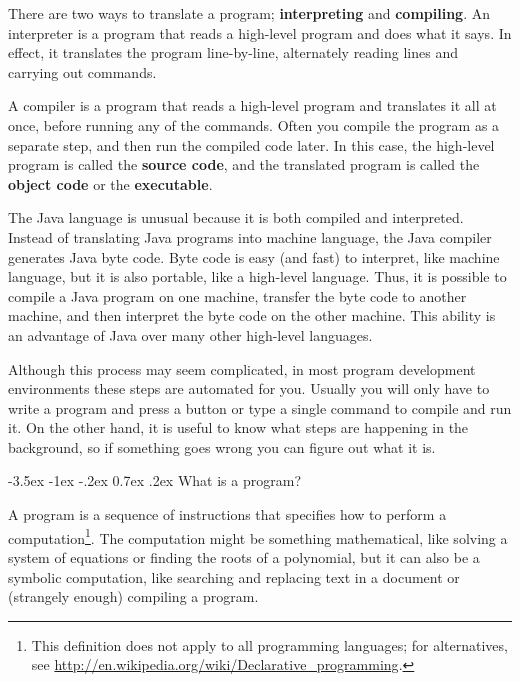 \documentclass{book}
\makeatletter
\renewcommand{\section}{\@startsection 
    {section} {1} {0mm}%
    {-3.5ex \@plus -1ex \@minus -.2ex}%
    {0.7ex \@plus.2ex}%
    {\normalfont\Large\bfseries}}
\newcommand{\beforefig}{\vspace{1.3\parskip}}
\newcommand{\afterfig}{\vspace{-0.2\parskip}}
\newcommand{\myfig}[1]{
    \beforefig
    \centerline{\epsfig{#1,scale=0.8}}
    \afterfig
}
\makeatother
\begin{document}
There are two ways to translate a program;
{\bf interpreting} and {\bf compiling}.  An interpreter
is a program that reads a high-level program
and does what it says.  In effect, it translates
the program line-by-line, alternately reading lines and
carrying out commands.

A compiler is a program that reads a high-level program and
translates it all at once, before running any of the commands.
Often you compile the program as a separate step, and then
run the compiled code later.  In this case, the high-level
program is called the {\bf source code}, and the translated
program is called the {\bf object code} or the {\bf executable}.

The Java language is unusual because it is both compiled and
interpreted.  Instead of translating Java programs into
machine language, the Java compiler generates Java byte code.
Byte code is easy (and fast) to interpret, like machine language,
but it is also portable, like a high-level language.  Thus,
it is possible to compile a Java program on one machine,
transfer the byte code to another machine,
and then interpret the byte code on the other machine.  This
ability is an advantage of Java over many other
high-level languages.


\myfig{figure=figs/java.eps}


Although this process may seem complicated, in most program
development environments these steps
are automated for you.  Usually you will only have to write a program
and press a button or type a single command to compile and run it.  On
the other hand, it is useful to know what steps are
happening in the background, so if something goes wrong you can
figure out what it is.



\section{What is a program?}

A program is a sequence of instructions that specifies how to perform
a computation\footnote{This definition does not apply to all
  programming languages; for alternatives, see
  \url{http://en.wikipedia.org/wiki/Declarative_programming}.}.  The
computation might be something mathematical, like solving a system of
equations or finding the roots of a polynomial, but it can also be a
symbolic computation, like searching and replacing text in a document
or (strangely enough) compiling a program.

\end{document}
